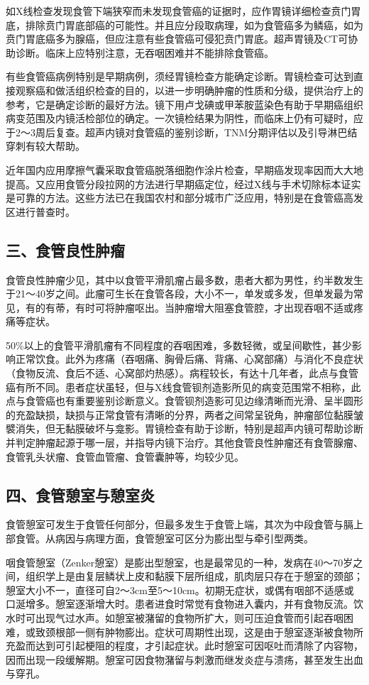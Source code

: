 如X线检查发现食管下端狭窄而未发现食管癌的证据时，应作胃镜详细检查贲门胃底，排除贲门胃底部癌的可能性。并且应分段取病理，如为食管癌多为鳞癌，如为贲门胃底癌多为腺癌，但应注意有些食管癌可侵犯贲门胃底。超声胃镜及CT可协助诊断。临床上应特别注意，无吞咽困难并不能排除食管癌。

有些食管癌病例特别是早期病例，须经胃镜检查方能确定诊断。胃镜检查可达到直接观察癌和做活组织检查的目的，以进一步明确肿瘤的性质和分级，提供治疗上的参考，它是确定诊断的最好方法。镜下用卢戈碘或甲苯胺蓝染色有助于早期癌组织病变范围及内镜活检部位的确定。一次镜检结果为阴性，而临床上仍有可疑时，应于2～3周后复查。超声内镜对食管癌的鉴别诊断，TNM分期评估以及引导淋巴结穿刺有较大帮助。

近年国内应用摩擦气囊采取食管癌脱落细胞作涂片检查，早期癌发现率因而大大地提高。又应用食管分段拉网的方法进行早期癌定位，经过X线与手术切除标本证实是可靠的方法。这些方法已在我国农村和部分城市广泛应用，特别是在食管癌高发区进行普查时。

\subsection{三、食管良性肿瘤}

食管良性肿瘤少见，其中以食管平滑肌瘤占最多数，患者大都为男性，约半数发生于21～40岁之间。此瘤可生长在食管各段，大小不一，单发或多发，但单发最为常见，有的有蒂，有时可将肿瘤呕出。当肿瘤增大阻塞食管腔，才出现吞咽不适或疼痛等症状。

50\%以上的食管平滑肌瘤有不同程度的吞咽困难，多数轻微，或呈间歇性，甚少影响正常饮食。此外为疼痛（吞咽痛、胸骨后痛、背痛、心窝部痛）与消化不良症状（食物反流、食后不适、心窝部灼热感）。病程较长，有达十几年者，此点与食管癌有所不同。患者症状虽轻，但与X线食管钡剂造影所见的病变范围常不相称，此点与食管癌也有重要鉴别诊断意义。食管钡剂造影可见边缘清晰而光滑、呈半圆形的充盈缺损，缺损与正常食管有清晰的分界，两者之间常呈锐角，肿瘤部位黏膜皱襞消失，但无黏膜破坏与龛影。胃镜检查有助于诊断，特别是超声内镜可帮助诊断并判定肿瘤起源于哪一层，并指导内镜下治疗。其他食管良性肿瘤还有食管腺瘤、食管乳头状瘤、食管血管瘤、食管囊肿等，均较少见。

\subsection{四、食管憩室与憩室炎}

食管憩室可发生于食管任何部分，但最多发生于食管上端，其次为中段食管与膈上部食管。从病因与病理方面，食管憩室可区分为膨出型与牵引型两类。

咽食管憩室（Zenker憩室）是膨出型憩室，也是最常见的一种，发病在40～70岁之间，组织学上是由复层鳞状上皮和黏膜下层所组成，肌肉层只存在于憩室的颈部；憩室大小不一，直径可自2～3cm至5～10cm。初期无症状，或偶有咽部不适感或口涎增多。憩室逐渐增大时。患者进食时常觉有食物进入囊内，并有食物反流。饮水时可出现气过水声。如憩室被潴留的食物所扩大，则可压迫食管而引起吞咽困难，或致颈根部一侧有肿物膨出。症状可周期性出现，这是由于憩室逐渐被食物所充盈而达到可引起梗阻的程度，才引起症状。此时憩室可因呕吐而清除了内容物，因而出现一段缓解期。憩室可因食物潴留与刺激而继发炎症与溃疡，甚至发生出血与穿孔。

